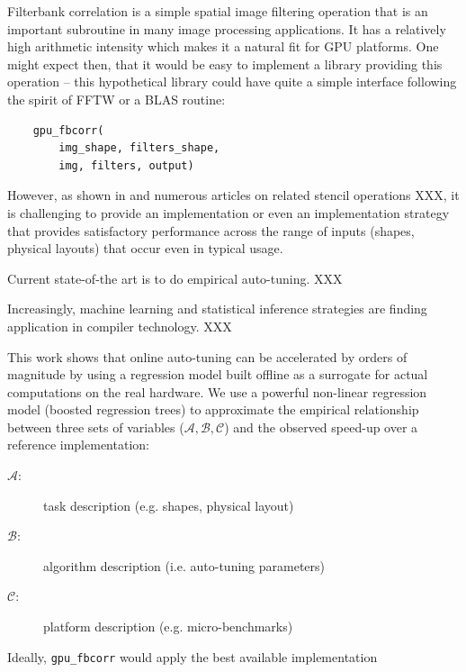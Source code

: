 \documentclass{sig-alternate}
\begin{document}
Filterbank correlation is a simple spatial image filtering operation that is
an important subroutine in many image processing applications. It has a relatively
high arithmetic intensity which makes it a natural fit for GPU platforms.
One might expect then, that it would be easy to implement a library providing
this operation -- this hypothetical library could have quite a simple interface
following the spirit of FFTW or a BLAS routine:
\begin{verbatim}
    gpu_fbcorr(
        img_shape, filters_shape,
        img, filters, output)
\end{verbatim}
However, as shown in \citet{pinto+cox:2011gcg} and numerous articles on
related stencil operations XXX, it is challenging to provide an implementation
or even an implementation strategy that provides satisfactory performance
across the range of inputs (shapes, physical layouts) that occur even in
typical usage.

Current state-of-the art is to do empirical auto-tuning.
XXX \vspace{12pt}

Increasingly, machine learning and statistical inference strategies are
finding application in compiler technology.
XXX \vspace{12pt}

This work shows that online auto-tuning can be accelerated by orders of
magnitude by using a regression model built offline as a surrogate for actual
computations on the real hardware.
We use a powerful non-linear regression model (boosted regression trees)
to approximate the empirical relationship between three sets of variables ($\mathcal{A},
\mathcal{B}, \mathcal{C}$) and the observed speed-up over a
reference implementation:
\begin{description}
\item[$\mathcal{A}$:] task description (e.g. shapes, physical layout)
\item[$\mathcal{B}$:] algorithm description (i.e. auto-tuning parameters)
\item[$\mathcal{C}$:] platform description (e.g. micro-benchmarks)
\end{description}
Ideally, \texttt{gpu\_fbcorr} would apply the best
available implementation 
\end{document}
